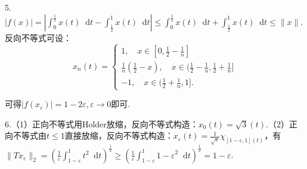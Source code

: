 \documentclass[bwprint, withoutpreface]{cumcmthesis}
\newcommand*{\dif}{\mathop{}\!\mathrm{d}}
\newcommand*{\norm}[1]{\| #1 \|}
\newcommand*{\nnorm}[2]{\| #1 \|_{#2}}
\begin{document}
5.$|f(x)| = |\int_{0}^{\frac{1}{2}} x(t) \dif t - \int_\frac{1}{2}^{1} x(t) \dif t| \leqslant \int_{0}^{\frac{1}{2}} x(t) \dif t + \int_\frac{1}{2}^{1} x(t) \dif t \leqslant \norm{x}$.反向不等式可设：
\begin{equation*}
	x_n(t) = 
	\begin{cases}
		1, \quad x \in [0, \frac{1}{2} - \frac{1}{n}] \\
		\frac{1}{n} (\frac{1}{2} - x), \quad x \in (\frac{1}{2} - \frac{1}{n}, \frac{1}{2} + \frac{1}{n}] \\
		-1, \quad x \in (\frac{1}{2} + \frac{1}{n}, 1].
	\end{cases}
\end{equation*}

可得$|f(x_\varepsilon)| = 1 - 2 \varepsilon, \varepsilon \to 0$即可.

6.（1）正向不等式用Holder放缩，反向不等式构造：$x_0(t) = \sqrt{3} (t)$.（2）正向不等式由$t \leqslant 1$直接放缩，反向不等式构造：$x_\varepsilon(t) = \frac{1}{\sqrt{\varepsilon}} \chi_{[1 - \varepsilon, 1](t)}$，有$\nnorm{Tx_\varepsilon}{2} = (\frac{1}{\varepsilon}\int_{1 - \varepsilon}^{1}{t^2} \dif t)^\frac{1}{2} \geqslant (\frac{1}{\varepsilon} \int_{1 - \varepsilon}^{1}{1 - \varepsilon}^2 \dif t)^{\frac{1}{2}} = 1 - \varepsilon$.
\end{document}
